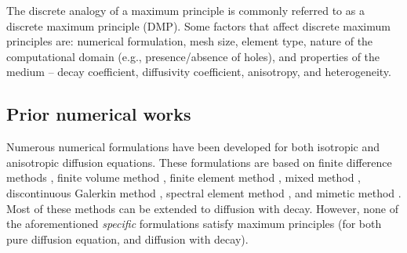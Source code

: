 \documentclass[11pt]{amsart}
\begin{document}
The discrete analogy of a maximum principle is commonly referred to as a discrete 
maximum principle (DMP). Some factors that affect discrete maximum principles 
are: numerical formulation, mesh size, element type, nature of the computational 
domain (e.g., presence/absence of holes), and properties of the medium -- decay 
coefficient, diffusivity coefficient, anisotropy, and heterogeneity.  

\subsection{Prior numerical works}
Numerous numerical formulations have been developed for both isotropic and anisotropic 
diffusion equations. These formulations are based on finite difference methods 
\cite{Morton_Mayers,Strikwerda}, finite volume method \cite{Patankar,
Eigestad_Aavatsmark_Espedal_CompGeoSci_2002_v6_p381,Droniou_Eymard_NumerMath_2006_v105_p35}, 
finite element method \cite{Braess,Hughes}, mixed method \cite{Brezzi_Fortin,Raviart_Thomas_MAFEM_1977_p292,
Nedelec_NumerMath_1980_v35_p315,Nedelec_NumerMath_1986_v50_p57,
Brezzi_Douglas_Marini_NumerMath_1985_v47_p217,
Brezzi_Douglas_Durran_Marini_NumerMath_1987_v51_p237,
Brezzi_Douglas_Fortin_Marini_MMNA_1987_v21_p581,
Masud_Hughes_CMAME_2002_v191_p4341,Nakshatrala_Turner_Hjelmstad_Masud_CMAME_2006_v195_p4036}, 
discontinuous Galerkin method \cite{Arnold_Brezzi_Cockburn_Marini_SIAMJNA_2002_v39_p1749,
Hughes_Masud_Wan_CMAME_2006_v195_p3347,Brezzi_Hughes_Marini_Masud_SIAMJSC_2005_v22_p119}, 
spectral element method \cite{Karniadakis_Sherwin}, and mimetic method 
\cite{Hyman_Morel_Shashkov_Steinberg_CompGeoSci_2002_v6_p333,
Kuznetsov_Lipnikov_Shashkov_CompGeoSci_2004_v8_p301,Brezzi_Lipnikov_Shashkov_SIAMJNA_2005_v43_p1872,
Lipnikov_Shashkov_Svyatskiy_JCP_2006_v211_p473}. Most of these methods can be extended to diffusion 
with decay. However, none of the aforementioned \emph{specific} formulations satisfy maximum principles 
(for both pure diffusion equation, and diffusion with decay). 
\end{document}
